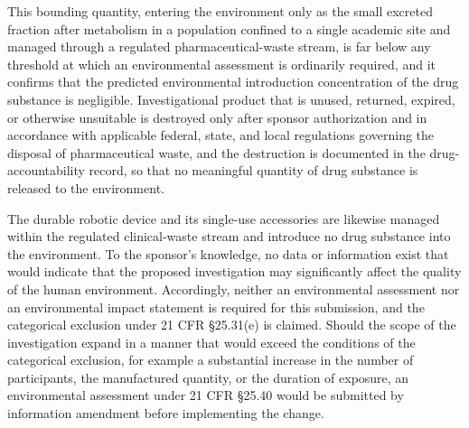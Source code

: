 This bounding quantity, entering the environment only as the small excreted
fraction after metabolism in a population confined to a single academic site and
managed through a regulated pharmaceutical-waste stream, is far below any
threshold at which an environmental assessment is ordinarily required, and it
confirms that the predicted environmental introduction concentration of the drug
substance is negligible. Investigational product that is unused, returned,
expired, or otherwise unsuitable is destroyed only after sponsor authorization
and in accordance with applicable federal, state, and local regulations governing
the disposal of pharmaceutical waste, and the destruction is documented in the
drug-accountability record, so that no meaningful quantity of drug substance
is released to the environment. 

The durable robotic device and its
single-use accessories are likewise managed within the regulated clinical-waste
stream and introduce no drug substance into the environment. To the sponsor's
knowledge, no data or information exist that would indicate that the proposed
investigation may significantly affect the quality of the human environment.
Accordingly, neither an environmental assessment nor an environmental impact
statement is required for this submission, and the categorical exclusion under 21
CFR \S 25.31(e) is claimed. Should the scope of the investigation expand in a
manner that would exceed the conditions of the categorical exclusion, for example
a substantial increase in the number of participants, the manufactured quantity,
or the duration of exposure, an environmental assessment under 21 CFR \S 25.40
would be submitted by information amendment before implementing the change.
